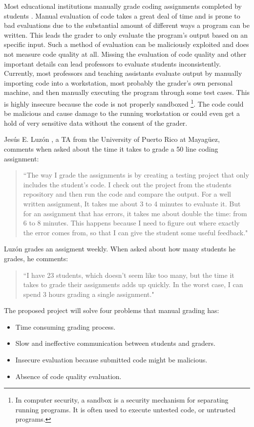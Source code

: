 
Most educational institutions manually grade coding assignments completed by
students \cite{Cheang2003}. Manual evaluation of code takes a great deal of time
and is prone to bad evaluations due to the substantial amount of different ways
a program can be written. This leads the grader to only evaluate the program's
output based on an specific input. Such a method of evaluation can be
maliciously exploited and does not measure code quality at all. Missing the
evaluation of code quality and other important details can lead professors to
evaluate students inconsistently. Currently, most professors and teaching
assistants evaluate output by manually importing code into a workstation, most
probably the grader's own personal machine, and then manually executing the
program through some test cases. This is highly insecure because the code is not
properly sandboxed \footnote{In computer security, a sandbox is a security
mechanism for separating running programs. It is often used to execute untested
code, or untrusted programs.}. The code could be malicious and cause damage to
the running workstation or could even get a hold of very sensitive data without
the consent of the grader.

Jesús E. Luzón \cite{Chiki}, a TA from the University of Puerto Rico at
Mayagüez, comments when asked about the time it takes to grade a 50 line coding
assignment: \begin{quote} ``The way I grade the assignments is by creating a
testing project that only includes the student's code. I check out the project
from the students repository and then run the code and compare the output. For a
well written assignment, It takes me about 3 to 4 minutes to evaluate it. But
for an assignment that has errors, it takes me about double the time: from 6 to
8 minutes. This happens because I need to figure out where exactly the error
comes from, so that I can give the student some useful feedback." \end{quote}
Luzón grades an assigment weekly. When asked about how many students he grades,
he comments: \begin{quote} ``I have 23 students, which doesn't seem like too
many, but the time it takes to grade their assignments adds up quickly. In the
worst case, I can spend 3 hours grading a single assignment." \end{quote}
The proposed project will solve four problems that manual grading has:
\begin{itemize}
\item Time consuming grading process.
\item Slow and ineffective communication between students and graders.
\item Insecure evaluation because submitted code might be malicious.
\item Absence of code quality evaluation.
\end{itemize}

